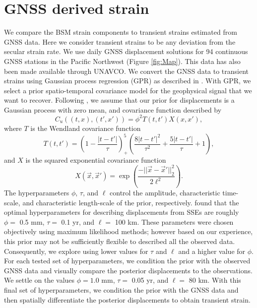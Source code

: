 \documentclass[10pt,a4paper]{article}
\begin{document}
\section{GNSS derived strain}
We compare the BSM strain components to transient strains estimated from GNSS data. Here we consider transient strains to be any deviation from the secular strain rate.  We use daily GNSS displacement solutions for 94 continuous GNSS stations in the Pacific Northwest (Figure \ref{fig:Map}). This data has also been made available through UNAVCO. We convert the GNSS data to transient strains using Gaussian process regression (GPR) as described in \citet{Hines2017a}. With GPR, we select a prior spatio-temporal covariance model for the geophysical signal that we want to recover. Following \citet{Hines2017a}, we assume that our prior for displacements is a Gaussian process with zero mean, and covariance function described by 
\begin{equation}\label{cov}
C_u((t,x),(t',x')) = \phi^2 T(t,t')X(x,x'),
\end{equation}        
where $T$ is the Wendland covariance function
\begin{equation}\label{eq:Wendland}
T(t,t') = \left(1 - \frac{|t - t'|}{\tau}\right)^5_+ \left(\frac{8|t - t'|^2}{\tau^2} + \frac{5|t - t'|}{\tau} + 1\right), 
\end{equation}
and $X$ is the squared exponential covariance function
\begin{equation}\label{eq:SE}
X(\vec{x},\vec{x}') = \exp\left(\frac{-||\vec{x} - \vec{x}'||_2^2}{2 \ell^2}\right).
\end{equation}
The hyperparameters $\phi$, $\tau$, and $\ell$ control the amplitude, characteristic time-scale, and characteristic length-scale of the prior, respectively. \citet{Hines2017a} found that the optimal hyperparameters for describing displacements from SSEs are roughly $\phi =$ 0.5 mm, $\tau =$ 0.1 yr, and $\ell =$ 100 km. These parameters were chosen objectively using maximum likelihood methods; however based on our experience, this prior may not be sufficiently flexible to described all the observed data. Consequently, we explore using lower values for $\tau$ and $\ell$ and a higher value for $\phi$. For each tested set of hyperparameters, we condition the prior with the observed GNSS data and visually compare the posterior displacements to the observations. We settle on the values $\phi = 1.0$ mm, $\tau =$ 0.05 yr, and $\ell =$ 80 km. With this final set of hyperparameters, we condition the prior with the GNSS data and then spatially differentiate the posterior displacements to obtain transient strain.
\end{document}
